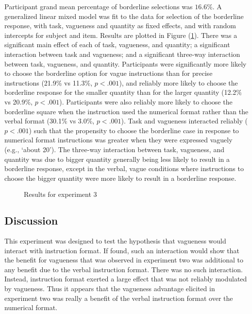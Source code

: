\documentclass[man,floatmark]{apa}
\begin{document}
Participant grand mean percentage of borderline selections was $16.6\%$. A generalized linear mixed model \cite{jaeger2008categorical} was fit to the data for selection of the borderline response, with task, vagueness and quantity as fixed effects, and with random intercepts for subject and item. Results are plotted in Figure (\ref{resultse3}). There was a significant main effect of each of task, vagueness, and quantity;  a significant interaction between task and vagueness; and a significant three-way interaction between task, vagueness, and quantity. Participants were significantly more likely to choose the borderline option for vague instructions than for precise instructions (21.9\% vs 11.3\%, $p<.001$), and reliably more likely to choose the borderline response for the smaller quantity than for the larger quantity (12.2\% vs 20.9\%, $p<.001$). Participants were also reliably more likely to choose the borderline square when the instruction used the numerical format rather than the verbal format (30.1\% vs 3.0\%, $p<.001$). Task and vagueness interacted reliably ($p<.001$) such that the propensity to choose the borderline case in response to numerical format instructions was greater when they were expressed vaguely (e.g., `about 20'). The three-way interaction between task, vagueness, and quantity was due to bigger quantity generally being less likely to result in a borderline response, except in the verbal, vague conditions where instructions to choose the bigger quantity were more likely to result in a borderline response. 

\begin{figure}[htbp]
\caption{Results for experiment 3}
\label{resultse3}
\end{figure}

\subsection{Discussion}

This experiment was designed to test the hypothesis that vagueness would interact with instruction format. If found, such an interaction would show that the benefit for vagueness that was observed in experiment two was additional to any benefit due to the verbal instruction format. There was no such interaction. Instead, instruction format exerted a large effect that was not reliably modulated by vagueness. Thus it appears that the vagueness advantage elicited in experiment two was really a benefit of the verbal instruction format over the numerical format.
\end{document}
